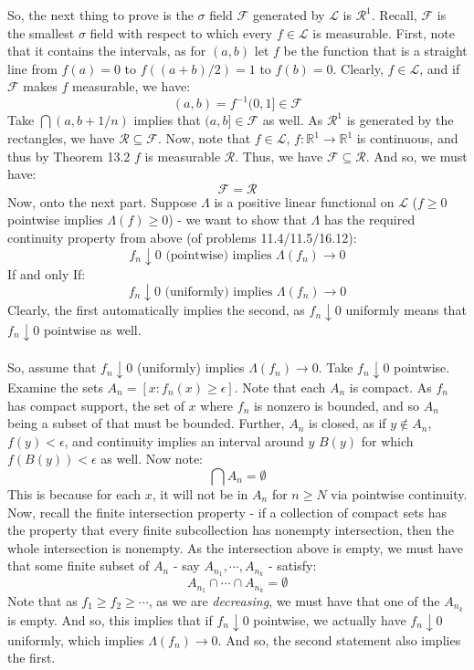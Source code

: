 \documentclass[12pt,a4paper]{article}
\newcommand{\1}[1]{\mathbbm{1}\left\{ #1 \right\}}
\newcommand{\R}{\mathbb{R}}
\newcommand{\lcal}{\mathcal{L}}
\newcommand{\fcal}{\mathcal{F}}
\newcommand{\rcal}{\mathcal{R}}
\begin{document}
So, the next thing to prove is the $\sigma$ field $\fcal$ generated by $\lcal$ is $\rcal^1$. Recall, $\fcal$ is the smallest $\sigma$ field with respect to which every $f \in \lcal$ is measurable. First, note that it contains the intervals, as for $(a,b)$ let $f$ be the function that is a straight line from $f(a) =
0$ to $f((a+b)/2) = 1$ to $f(b) = 0$. Clearly, $f \in \lcal$, and if $\fcal$ makes $f$ measurable, we have:
$$
	(a,b) = f^{-1}(0,1] \in \fcal
$$
Take $\bigcap (a, b + 1/n)$ implies that $(a,b] \in \fcal$ as well. As $\rcal^1$ is generated by the rectangles, we have $\rcal \subseteq \fcal$. Now, note that $f \in \lcal$, $f: \R^1 \to \R^1$ is continuous, and thus by Theorem 13.2 $f$ is measurable $\rcal$. Thus, we have $\fcal \subseteq \rcal$. And so, we must have:
$$
	\fcal = \rcal
$$
Now, onto the next part. Suppose $\Lambda$ is a positive linear functional on $\lcal$ ($f \geq 0$ pointwise implies $\Lambda(f) \geq 0$) - we want to show that $\Lambda$ has the required continuity property from above (of problems 11.4/11.5/16.12):
$$
	\text{$f_n \downarrow 0$ (pointwise) implies $\Lambda(f_n) \to 0$}
$$
If and only If:
$$
	\text{$f_n \downarrow 0$ (uniformly) implies $\Lambda(f_n) \to 0$}
$$
Clearly, the first automatically implies the second, as $f_n \downarrow 0$ uniformly means that $f_n \downarrow 0$ pointwise as well.
\\\\
So, assume that $f_n \downarrow 0$ (uniformly) implies $\Lambda(f_n) \to 0$. Take $f_n \downarrow 0$ pointwise. Examine the sets $A_n = [x : f_n(x) \geq \epsilon]$. Note that each $A_n$ is compact. As $f_n$ has compact support, the set of $x$ where $f_n$ is nonzero is bounded, and so $A_n$ being a subset of that must be bounded. Further, $A_n$ is closed, as if $y \not\in A_n$, $f(y) < \epsilon$, and continuity implies an interval around $y$ $B(y)$ for which $f(B(y)) < \epsilon$ as well. Now note:
$$
	\bigcap A_n = \emptyset
$$
This is because for each $x$, it will not be in $A_n$ for $n \geq N$ via pointwise continuity. Now, recall the finite intersection property - if a collection of compact sets has the property that every finite subcollection has nonempty intersection, then the whole intersection is nonempty. As the intersection above is empty, we must have that some finite subset of $A_n$ - say $A_{n_1}, \cdots, A_{n_k}$ - satisfy:
$$
	A_{n_1} \cap \cdots \cap A_{n_k} = \emptyset
$$
Note that as $f_1 \geq f_2 \geq \cdots$, as we are \textit{decreasing}, we must have that one of the $A_{n_k}$ is empty. And so, this implies that if $f_n \downarrow 0$ pointwise, we actually have $f_n \downarrow 0$ uniformly, which implies $\Lambda(f_n) \to 0$. And so, the second statement also implies the first.
\end{document}
